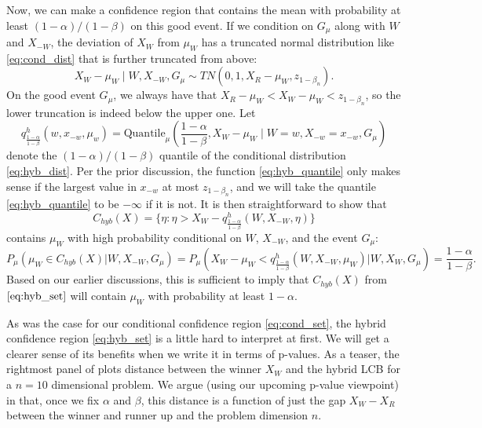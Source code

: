 \documentclass{article}
\begin{document}
\begin{appendix}
Now, we can make a confidence region that contains the mean with probability at least $(1-\alpha)/(1-\beta)$ on this good event. If we condition on $G_{\mu}$ along with $W$ and $X_{-W}$, the deviation of $X_W$ from $\mu_W$ has a truncated normal distribution like \eqref{eq:cond_dist} that is further truncated from above:
\begin{equation}
    \label{eq:hyb_dist}
    X_W - \mu_W \mid W, X_{-W}, G_{\mu} \sim TN(0, 1, X_{R} - \mu_{W}, z_{1-\beta_n} ).
\end{equation}
On the good event $G_{\mu}$, we always have that $X_R - \mu_{W} < X_W - \mu_{W} < z_{1-\beta_n}$, so the lower truncation is indeed below the upper one. Let
\begin{equation}
\label{eq:hyb_quantile}
    q^{h}_{\frac{1-\alpha}{1-\beta}}(w, x_{-w}, \mu_w) = \text{Quantile}_{\mu}\left(\frac{1-\alpha}{1-\beta}, X_W -  \mu_{W} \mid W=w, X_{-w} = x_{-w}, G_{\mu}\right)
\end{equation}
denote the $(1-\alpha)/(1-\beta)$ quantile of the conditional distribution \eqref{eq:hyb_dist}. Per the prior discussion, the function \eqref{eq:hyb_quantile} only makes sense if the largest value in $x_{-w}$ at most $z_{1-\beta_n}$, and we will take the quantile \eqref{eq:hyb_quantile} to be $-\infty$ if it is not. It is then straightforward to show that
\begin{equation}
\label{eq:hyb_set}
     C_{hyb}(X) = \{\eta : \eta > X_{W} - q^{h}_{\frac{1-\alpha}{1-\beta}}(W, X_{-W}, \eta)  \} 
\end{equation}
contains $\mu_{W}$ with high probability conditional on $W$, $X_{-W}$, and the event $G_{\mu}$:
\begin{equation*}
    P_{\mu}( \mu_{W} \in C_{hyb}(X) | W, X_{-W}, G_{\mu})  = P_{\mu}( X_W - \mu_W < q^{h}_{\frac{1-\alpha}{1-\beta}}(W, X_{-W}, \mu_{W}) |W, X_W, G_{\mu}) = \frac{1-\alpha}{1-\beta}.
\end{equation*}
Based on our earlier discussions, this is sufficient to imply that $C_{hyb}(X)$ from $\eqref{eq:hyb_set}$ will contain $\mu_{W}$ with probability at least $1-\alpha$. 

As was the case for our conditional confidence region \eqref{eq:cond_set}, the hybrid confidence region \eqref{eq:hyb_set} is a little hard to interpret at first. We will get a clearer sense of its benefits when we write it in terms of p-values. As a teaser, the rightmost panel of  plots distance between the winner $X_W$ and the hybrid LCB for a $n=10$ dimensional problem. We argue (using our upcoming p-value viewpoint) in  that, once we fix $\alpha$ and $\beta$, this distance is a function of just the gap $X_W - X_R$ between the winner and runner up and the problem dimension $n$. 


\end{appendix}
\end{document}

